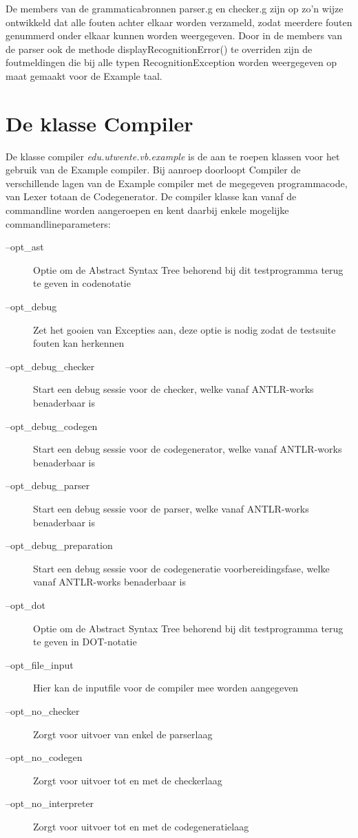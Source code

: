 De members van de grammaticabronnen parser.g en checker.g zijn op zo'n wijze ontwikkeld dat alle fouten achter elkaar worden verzameld, zodat meerdere fouten genummerd onder elkaar kunnen worden weergegeven. Door in de members van de parser ook de methode displayRecognitionError() te overriden zijn de foutmeldingen die bij alle typen RecognitionException worden weergegeven op maat gemaakt voor de Example taal.

\section{De klasse Compiler}
De klasse compiler \emph{edu.utwente.vb.example} is de aan te roepen klassen voor het gebruik van de Example compiler. Bij aanroep doorloopt Compiler de verschillende lagen van de Example compiler met de megegeven programmacode, van Lexer totaan de Codegenerator. De compiler klasse kan vanaf de commandline worden aangeroepen en kent daarbij enkele mogelijke commandlineparameters:
\begin{description}
    \item[--opt\_ast]                   Optie om de Abstract Syntax Tree behorend bij dit testprogramma terug te geven in codenotatie
    \item[--opt\_debug]                 Zet het gooien van Excepties aan, deze optie is nodig zodat de testsuite fouten kan herkennen
    \item[--opt\_debug\_checker]        Start een debug sessie voor de checker, welke vanaf ANTLR-works benaderbaar is
    \item[--opt\_debug\_codegen]        Start een debug sessie voor de codegenerator, welke vanaf ANTLR-works benaderbaar is
    \item[--opt\_debug\_parser]         Start een debug sessie voor de parser, welke vanaf ANTLR-works benaderbaar is
    \item[--opt\_debug\_preparation]    Start een debug sessie voor de codegeneratie voorbereidingsfase, welke vanaf ANTLR-works benaderbaar is
    \item[--opt\_dot]                   Optie om de Abstract Syntax Tree behorend bij dit testprogramma terug te geven in DOT-notatie
    \item[--opt\_file\_input]           Hier kan de inputfile voor de compiler mee worden aangegeven
    \item[--opt\_no\_checker]           Zorgt voor uitvoer van enkel de parserlaag
    \item[--opt\_no\_codegen]           Zorgt voor uitvoer tot en met de checkerlaag
    \item[--opt\_no\_interpreter]       Zorgt voor uitvoer tot en met de codegeneratielaag
\end{description}

